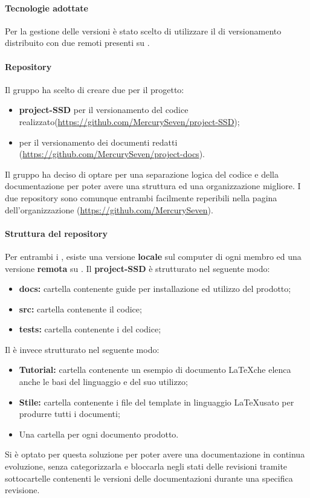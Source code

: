 {{\paragraph*{Tecnologie adottate}
Per la gestione delle versioni è stato scelto di utilizzare il  di versionamento distribuito \textit{} con due  remoti presenti su \textit{}.
\paragraph*{Repository}
Il gruppo \textit{\Gruppo{}} ha scelto di creare due  per il progetto:
\begin{itemize}
	\item \textbf{project-SSD} per il versionamento del codice realizzato(\url{https://github.com/MercurySeven/project-SSD});
	\item \textbf{\repoDoc{}} per il versionamento dei documenti redatti (\url{https://github.com/MercurySeven/project-docs}).
\end{itemize}
Il gruppo ha deciso di optare per una separazione logica del codice e della documentazione per poter avere una struttura ed una organizzazione migliore. I due repository sono comunque entrambi facilmente reperibili nella pagina dell'organizzazione (\url{https://github.com/MercurySeven}).
\paragraph*{Struttura del repository}
Per entrambi i , esiste una versione \textbf{locale} sul computer di ogni membro ed una versione \textbf{remota} su \textit{}.\newline
Il  \textbf{project-SSD} è strutturato nel seguente modo:
\begin{itemize}
	\item \textbf{docs:} cartella contenente guide per installazione ed utilizzo del prodotto;
	\item \textbf{src:} cartella contenente il codice;
	\item \textbf{tests:} cartella contenente i  del codice;
\end{itemize}
Il  \textbf{\repoDoc{}} è invece strutturato nel seguente modo:
\begin{itemize}
	\item \textbf{Tutorial:} cartella contenente un esempio di documento \LaTeX che elenca anche le basi del linguaggio e del suo utilizzo; 
	\item \textbf{Stile:} cartella contenente i file del template in linguaggio \LaTeX usato per produrre tutti i documenti;
	\item Una cartella per ogni documento prodotto.
\end{itemize}
Si è optato per questa soluzione per poter avere una documentazione in continua evoluzione, senza categorizzarla e bloccarla negli stati delle revisioni tramite sottocartelle contenenti le versioni delle documentazioni durante una specifica revisione.
}}
